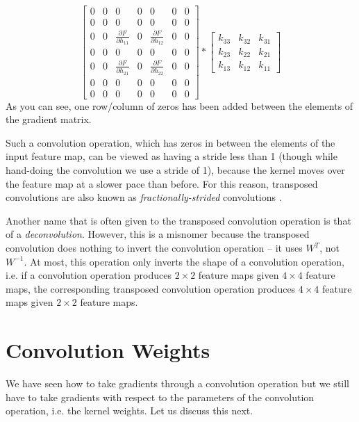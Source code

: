 \documentclass{article}[a4paper]
\begin{document}
\begin{equation*}
	\renewcommand{\arraystretch}{1.5}
	\begin{bmatrix}
		0 & 0 & 0 & 0 & 0 & 0 & 0 \\
		0 & 0 & 0 & 0 & 0 & 0 & 0 \\
		0 & 0 & \frac{\partial F}{\partial h_{11}} & 0 & \frac{\partial F}{\partial h_{12}} & 0 & 0 \\
		0 & 0 & 0 & 0 & 0 & 0 & 0 \\
		0 & 0 & \frac{\partial F}{\partial h_{21}} & 0 & \frac{\partial F}{\partial h_{22}} & 0 & 0 \\
		0 & 0 & 0 & 0 & 0 & 0 & 0 \\
		0 & 0 & 0 & 0 & 0 & 0 & 0
	\end{bmatrix} *
	\begin{bmatrix}
		k_{33} & k_{32} & k_{31} \\
		k_{23} & k_{22} & k_{21} \\
		k_{13} & k_{12} & k_{11}
	\end{bmatrix}
\end{equation*}
As you can see, one row/column of zeros has been added between the elements of the gradient matrix.

Such a convolution operation, which has zeros in between the elements of the input feature map, can be viewed as having a stride less than 1 (though while hand-doing the convolution we use a stride of 1), because the kernel moves over the feature map at a slower pace than before. For this reason, transposed convolutions are also known as \textit{fractionally-strided} convolutions \cite{dumoulin2016guide}.

Another name that is often given to the transposed convolution operation is that of a \textit{deconvolution}. However, this is a misnomer \cite{dumoulin2016guide} because the transposed convolution does nothing to invert the convolution operation -- it uses $W^T$, not $W^{-1}$. At most, this operation only inverts the shape of a convolution operation, i.e. if a convolution operation produces $2 \times 2$ feature maps given $4 \times 4$ feature maps, the corresponding transposed convolution operation produces $4 \times 4$ feature maps given $2 \times 2$ feature maps.

\section{Convolution Weights}
We have seen how to take gradients through a convolution operation but we still have to take gradients with respect to the parameters of the convolution operation, i.e. the kernel weights. Let us discuss this next.
\end{document}
